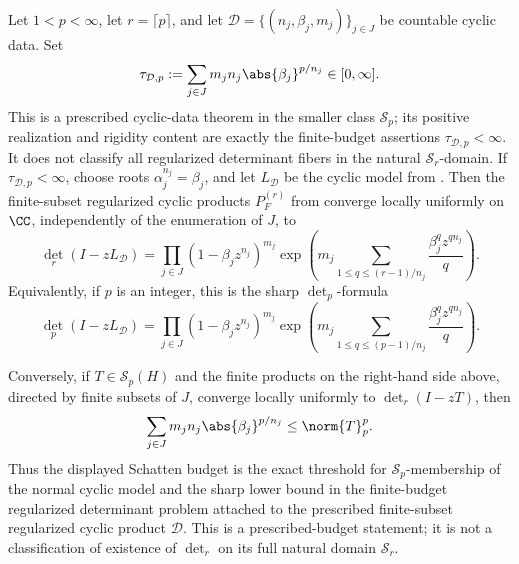 \begin{theorem}
  \label{thm:schatten-cyclic-regularized-determinant}
  Let \(1<p<\infty\), let \(r=\lceil p\rceil\), and let
  \(\mathcal D=\{(n_j,\beta_j,m_j)\}_{j\in J}\) be countable cyclic data. Set
  \[
    \tau_{\mathcal D,p}
    :=\sum_{j\in J}m_jn_j\abs{\beta_j}^{p/n_j}\in[0,\infty].
  \]
  This is a prescribed cyclic-data theorem in the smaller class
  \(\mathcal S_p\); its positive realization and rigidity content are exactly
  the finite-budget assertions \(\tau_{\mathcal D,p}<\infty\).  It does not
  classify all regularized determinant fibers in the natural
  \(\mathcal S_r\)-domain.  If \(\tau_{\mathcal D,p}<\infty\), choose roots
  \(\alpha_j^{n_j}=\beta_j\), and let
  \(L_{\mathcal D}\) be the cyclic model from
  . Then the finite-subset
  regularized cyclic products
  \(P_F^{(r)}\) from
   converge locally
  uniformly on \(\CC\), independently of the enumeration of \(J\), to
  \[
    \det_r(I-zL_{\mathcal D})
    =
    \prod_{j\in J}
      (1-\beta_jz^{n_j})^{m_j}
      \exp\!\left(
        m_j\sum_{1\le q\le (r-1)/n_j}
          \frac{\beta_j^qz^{qn_j}}{q}
      \right).
  \]
  Equivalently, if \(p\) is an integer, this is the sharp
  \(\det_p\)-formula
  \[
    \det_p(I-zL_{\mathcal D})
    =
    \prod_{j\in J}
      (1-\beta_jz^{n_j})^{m_j}
      \exp\!\left(
        m_j\sum_{1\le q\le (p-1)/n_j}
          \frac{\beta_j^qz^{qn_j}}{q}
      \right).
  \]

  Conversely, if \(T\in\mathcal S_p(H)\) and the finite products on the
  right-hand side above, directed by finite subsets of \(J\), converge
  locally uniformly to \(\det_r(I-zT)\), then
  \[
    \sum_{j\in J}m_jn_j\abs{\beta_j}^{p/n_j}
    \le \norm{T}_p^p.
  \]
  Thus the displayed Schatten budget is the exact threshold for
  \(\mathcal S_p\)-membership of the normal cyclic model and the sharp
  lower bound in the finite-budget regularized determinant problem attached to
  the prescribed finite-subset regularized cyclic product \(\mathcal D\). This is a
  prescribed-budget statement;
  it is not a classification of existence of \(\det_r\) on its full natural
  domain \(\mathcal S_r\).
\end{theorem}

